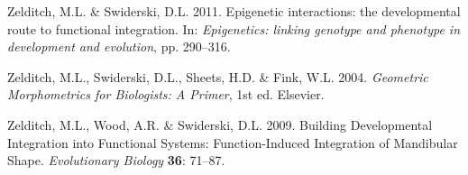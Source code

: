 \documentclass[12pt,]{article}
\begin{document}
Zelditch, M.L. \& Swiderski, D.L. 2011. Epigenetic interactions: the
developmental route to functional integration. In: \emph{Epigenetics:
linking genotype and phenotype in development and evolution}, pp.
290--316.

Zelditch, M.L., Swiderski, D.L., Sheets, H.D. \& Fink, W.L. 2004.
\emph{Geometric Morphometrics for Biologists: A Primer}, 1st ed.
Elsevier.

Zelditch, M.L., Wood, A.R. \& Swiderski, D.L. 2009. Building
Developmental Integration into Functional Systems: Function-Induced
Integration of Mandibular Shape. \emph{Evolutionary Biology}
\textbf{36}: 71--87.
\end{document}
